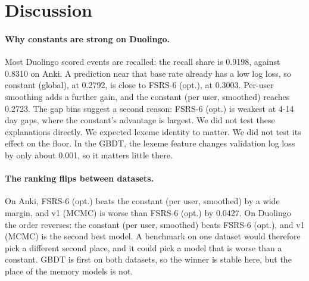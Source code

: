 \section{Discussion}
\paragraph{Why constants are strong on Duolingo.}
Most Duolingo scored events are recalled: the recall share is 0.9198, against 0.8310 on Anki.
A prediction near that base rate already has a low log loss, so constant (global), at 0.2792, is close to FSRS-6 (opt.), at 0.3003.
Per-user smoothing adds a further gain, and the constant (per user, smoothed) reaches 0.2723.
The gap bins suggest a second reason: FSRS-6 (opt.) is weakest at 4-14 day gaps, where the constant's advantage is largest.
We did not test these explanations directly.
We expected lexeme identity to matter. We did not test its effect on the floor. In the GBDT, the lexeme feature changes validation log loss by only about 0.001, so it matters little there.

\paragraph{The ranking flips between datasets.}
On Anki, FSRS-6 (opt.) beats the constant (per user, smoothed) by a wide margin, and v1 (MCMC) is worse than FSRS-6 (opt.) by 0.0427.
On Duolingo the order reverses: the constant (per user, smoothed) beats FSRS-6 (opt.), and v1 (MCMC) is the second best model.
A benchmark on one dataset would therefore pick a different second place, and it could pick a model that is worse than a constant.
GBDT is first on both datasets, so the winner is stable here, but the place of the memory models is not.

